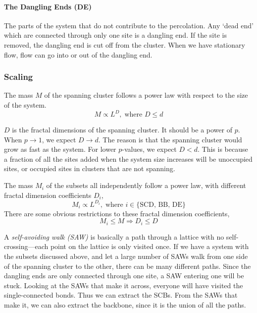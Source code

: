 \documentclass[11pt]{article}
\numberwithin{equation}{section}
\numberwithin{figure}{section}
\newcommand{\ita}[1]{\textit{#1}}
\begin{document}
\paragraph{The Dangling Ends (DE)} The parts of the system that
do not contribute to the percolation. Any `dead end' which are
connected through only one site is a dangling end.
If the site is removed, the dangling end is cut off from
the cluster. When we have stationary flow, flow can go into or
out of the dangling end.

\subsubsection{Scaling}
The mass $M$ of the spanning cluster follows a power law
with respect to the size of the system.
\begin{equation}
    M\propto L^D,\;\text{where } D \leq d
\end{equation}

$D$ is the fractal dimensions of the spanning cluster.
It should be a power of $p$.
When $p\rightarrow 1$, we expect $D\rightarrow d$.
The reason is that the spanning cluster would grow as fast as
the system. For lower $p$-values, we expect $D < d$.
This is because a fraction of all the sites added when the
system size increases will be unoccupied sites, or
occupied sites in clusters that are not spanning.

The mass $M_i$ of the subsets all independently follow a power law,
with different fractal dimension coefficients $D_i$,
\begin{equation}
    M_i \propto L^{D_i}, \;\text{where } i\in \text{\{SCD, BB, DE\}}
\end{equation}
There are some obvious restrictions to these 
fractal dimension coefficients,
\begin{equation}
    M_i \leq M \Rightarrow D_i \leq D
\end{equation}

A \ita{self-avoiding walk (SAW)} is basically a path through a
lattice with no self-crossing---each point on the
lattice is only visited once.
If we have a system with the subsets discussed above,
and let a large number of SAWs walk from one side of the spanning
cluster to the other, there can be many different paths.
Since the dangling ends are only connected through one site,
a SAW entering one will be stuck.
Looking at the SAWs that make it across, everyone will
have visited the single-connected bonds. Thus
we can extract the SCBs. From the SAWs that make it,
we can also extract the backbone, since it is the union of all
the paths.
\end{document}
